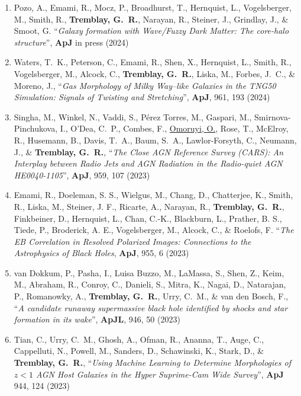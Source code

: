 \documentclass[11pt]{article}
\begin{document}
\begin{enumerate}[resume]
\item Pozo, A., Emami, R., Mocz, P., Broadhurst, T., Hernquist, L., Vogelsberger, M., Smith, R., \textbf{Tremblay, G.~R.}, Narayan, R., Steiner, J., Grindlay, J., \& Smoot, G. ``\textit{Galaxy formation with Wave/Fuzzy Dark Matter: The core-halo structure}'', \textbf{ApJ} in press (2024)

\item Waters, T.~K., Peterson, C., Emami, R., Shen, X., Hernquist, L., Smith, R., Vogelsberger, M., Alcock, C., \textbf{Tremblay, G.~R.}, Liska, M., Forbes, J.~C., \&  Moreno, J., ``\textit{Gas Morphology of Milky Way–like Galaxies in the TNG50 Simulation: Signals of Twisting and Stretching}'', \textbf{ApJ}, 961, 193 (2024)


\item Singha, M.,  Winkel, N., Vaddi, S., P\'{e}rez Torres, M., Gaspari, M., Smirnova-Pinchukova, I., O'Dea, C.~P.,  Combes, F.,  \uline{Omoruyi, O.}, Rose, T., McElroy, R.,  Husemann, B.,  Davis, T.~A., Baum, S.~A., Lawlor-Forsyth, C.,  Neumann, J., \& \textbf{Tremblay, G.~R.}, ``\textit{The Close AGN Reference Survey (CARS): An Interplay between Radio Jets and AGN Radiation in the Radio-quiet AGN HE0040-1105}'', \textbf{ApJ}, 959, 107 (2023)

\item Emami, R., Doeleman, S. S., Wielgus, M., Chang, D., Chatterjee, K., Smith, R., Liska, M., Steiner, J. F., Ricarte, A., Narayan, R., \textbf{Tremblay, G.~R.}, Finkbeiner, D., Hernquist, L., Chan, C.-K., Blackburn, L., Prather, B. S., Tiede, P., Broderick, A. E., Vogelsberger, M., Alcock, C., \& Roelofs, F. ``\textit{The EB Correlation in Resolved Polarized Images: Connections to the Astrophysics of Black Holes}, \textbf{ApJ}, 955, 6 (2023)


\item van Dokkum, P., Pasha, I., Luisa Buzzo, M., LaMassa, S., Shen, Z., Keim, M., Abraham, R., Conroy, C., Danieli, S., Mitra, K., Nagai, D., Natarajan, P., Romanowky, A., \textbf{Tremblay, G.~R.}, Urry, C.~M., \& van den Bosch, F., ``\textit{A candidate runaway supermassive black hole identified by shocks and star formation in its wake}'', \textbf{ApJL}, 946, 50 (2023)


\item Tian, C., Urry, C.~M., Ghosh, A., Ofman, R., Ananna, T.,  Auge, C.,  Cappelluti, N.,  Powell, M., Sanders, D.,  Schawinski, K., Stark, D., \& \textbf{Tremblay, G.~R.}, ``\textit{Using Machine Learning to Determine Morphologies of  $z<1$  AGN Host Galaxies in the Hyper Suprime-Cam Wide Survey}'', \textbf{ApJ} 944, 124 (2023)


\end{enumerate}
\end{document}
